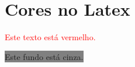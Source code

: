 \documentclass{article}
\begin{document}
	\section{Cores no Latex}
	
	\textcolor{red}{Este texto está vermelho.}
	
	\colorbox{gray}{Este fundo está cinza.}
	
	\pagecolor{yellow}
\end{document}
